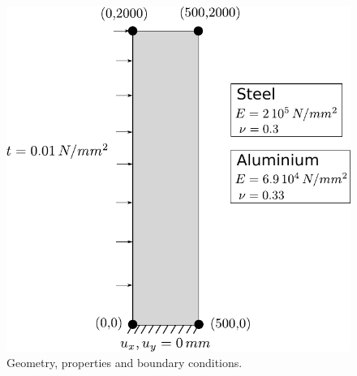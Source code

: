 \documentclass[12pt]{article}
\begin{document}
\begin{figure}[htp]
\begin{center}
\includegraphics[width=0.6\linewidth]{mast.pdf}
\caption{Geometry, properties and boundary conditions.}
\label{fig:geometry}
\end{center}
\end{figure}

\end{document}
